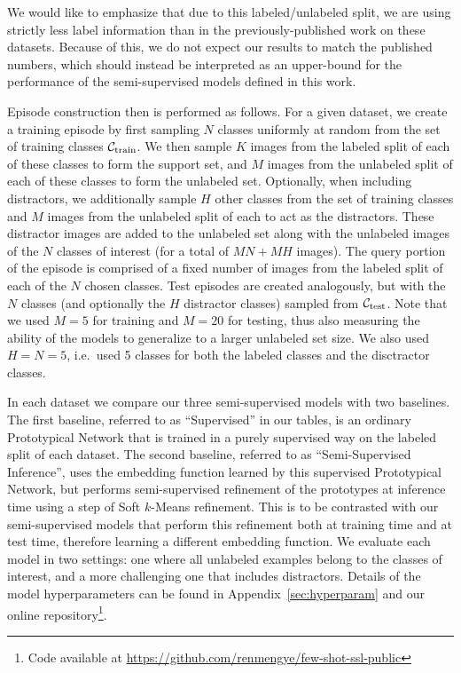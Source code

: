 We would like to emphasize that due to this labeled/unlabeled split, we are using strictly less
label information than in the previously-published work on these datasets. Because of this, we do
not expect our results to match the published numbers, which should instead be interpreted as an
upper-bound for the performance of the semi-supervised models defined in this work.

Episode construction then is performed as follows. For a given dataset, we create a training episode
by first sampling $N$ classes uniformly at random from the set of training classes ${\cal C}_{\rm
train}$. We then sample $K$ images from the labeled split of each of these classes to form the
support set, and $M$ images from the unlabeled split of each of these classes to form the unlabeled
set. Optionally, when including distractors, we additionally sample $H$ other classes from the set
of training classes and $M$ images from the unlabeled split of each to act as the distractors. These
distractor images are added to the unlabeled set along with the unlabeled images of the $N$ classes
of interest (for a total of $MN + MH$ images). The query portion of the episode is comprised of a
fixed number of images from the labeled split of each of the $N$ chosen classes. Test episodes are
created analogously, but with the $N$ classes (and optionally the $H$ distractor classes) sampled
from ${\cal C}_{\rm test}$. Note that we used $M=5$ for training and $M=20$ for testing, thus also
measuring the ability of the models to generalize to a larger unlabeled set size. We also used
$H=N=5$, i.e.\ used 5 classes for both the labeled classes and the disctractor classes.

In each dataset we compare our three semi-supervised models with two baselines. The first baseline,
referred to as ``Supervised'' in our tables, is an ordinary Prototypical Network that is trained in
a purely supervised way on the labeled split of each dataset. The second baseline, referred to as
``Semi-Supervised Inference'', uses the embedding function learned by this supervised Prototypical
Network, but performs semi-supervised refinement of the prototypes at inference time using a step of
Soft $k$-Means refinement. This is to be contrasted with our semi-supervised models that perform
this refinement both at training time and at test time, therefore learning a different embedding
function. We evaluate each model in two settings: one where all unlabeled examples belong to the
classes of interest, and a more challenging one that includes distractors. Details of the model
hyperparameters can be found in Appendix~\ref{sec:hyperparam} and our online repository\footnote{
Code available at
\url{https://github.com/renmengye/few-shot-ssl-public}}.



